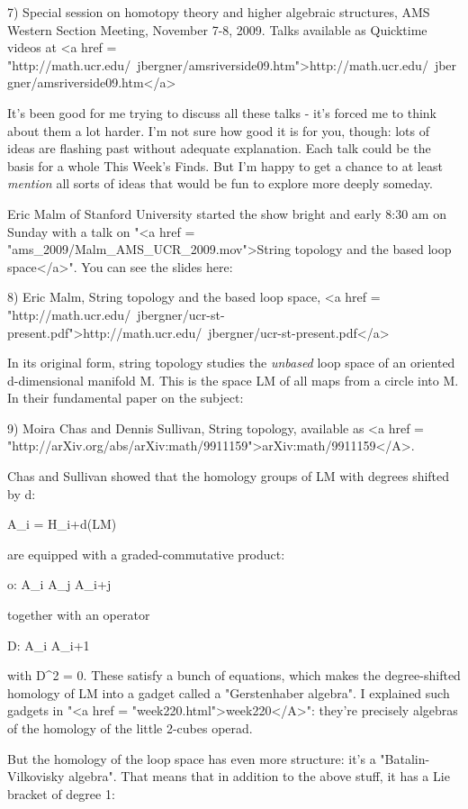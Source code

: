 7) Special session on homotopy theory and higher algebraic structures,
AMS Western Section Meeting, November 7-8, 2009.  Talks available as
Quicktime videos at <a href =
"http://math.ucr.edu/~jbergner/amsriverside09.htm">http://math.ucr.edu/~jbergner/amsriverside09.htm</a>

It's been good for me trying to discuss all these talks - it's forced
me to think about them a lot harder.  I'm not sure how good it is for
you, though: lots of ideas are flashing past without adequate
explanation.  Each talk could be the basis for a whole This Week's
Finds.  But I'm happy to get a chance to at least \emph{mention} all sorts
of ideas that would be fun to explore more deeply someday.

Eric Malm of Stanford University started the show bright and early
8:30 am on Sunday with a talk on 
"<a href = "ams_2009/Malm_AMS_UCR_2009.mov">String topology and the based loop
space</a>".  You can see the slides here:

8) Eric Malm, String topology and the based loop space,
<a href = "http://math.ucr.edu/~jbergner/ucr-st-present.pdf">http://math.ucr.edu/~jbergner/ucr-st-present.pdf</a>

In its original form, string topology studies the \emph{unbased} loop space
of an oriented d-dimensional manifold M.  This is the space LM of all
maps from a circle into M.  In their fundamental paper on the subject:

9) Moira Chas and Dennis Sullivan, String topology, available
as <a href = "http://arXiv.org/abs/arXiv:math/9911159">arXiv:math/9911159</A>.

Chas and Sullivan showed that the homology groups of LM with degrees
shifted by d:

A_{i} = H_{i+d}(LM)

are equipped with a graded-commutative product:

o: A_{i} \otimes  A_{j} \to  A_{i+j}

together with an operator

D: A_{i} \to  A_{i+1}

with D^{2} = 0.  These satisfy a bunch of equations, which
makes the degree-shifted homology of LM into a gadget called a
"Gerstenhaber algebra".  I explained such gadgets in
"<a href = "week220.html">week220</A>": they're precisely
algebras of the homology of the little 2-cubes operad.

But the homology of the loop space has even more structure: it's a
"Batalin-Vilkovisky algebra".  That means that in addition
to the above stuff, it has a Lie bracket of degree 1:

